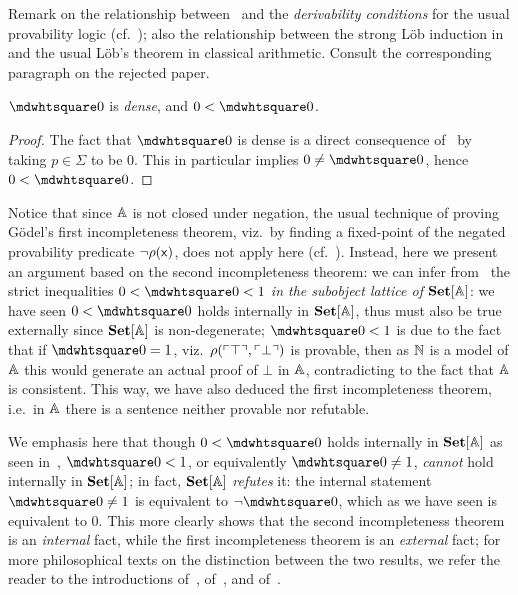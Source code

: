 \begin{remark}\label{rem:derivabilityconditions}
  Remark on the relationship between~ and the \emph{derivability conditions} for the usual provability logic (cf.~\citet[Def.~III.2.16]{Hájek_Pudlák_2017}); also the relationship between the strong L\"ob induction in~ and the usual L\"ob's theorem in classical arithmetic. Consult the corresponding paragraph on the rejected paper.
\end{remark}

\begin{corollary}\label{cor:secondincomp}
  $\bx 0$ is \emph{dense}, and $0 < \bx 0$. 
\end{corollary}
\begin{proof}
  The fact that $\bx 0$ is dense is a direct consequence of~ by taking $p\in\Sigma$ to be $0$. This in particular implies $0 \neq \bx 0$, hence $0 < \bx 0$. 
\end{proof}

\begin{remark}\label{rem:firstfromsecond}
  Notice that since $\mathbb{A}$ is not closed under negation, the usual technique of proving G\"odel's first incompleteness theorem, viz.\ by finding a fixed-point of the negated provability predicate $\neg\rho(\mathsf{x})$, does not apply here (cf.~). Instead, here we present an argument based on the second incompleteness theorem: we can infer from~ the strict inequalities $0 < \bx 0 < 1$ \emph{in the subobject lattice of $\mathbf{Set}[\mathbb{A}]$}: we have seen $0 < \bx 0$ holds internally in $\mathbf{Set}[\mathbb{A}]$, thus must also be true externally since $\mathbf{Set}[\mathbb{A}]$ is non-degenerate; $\bx 0 < 1$ is due to the fact that if $\bx 0 = 1$, viz.\ $\rho(\ulcorner \top \urcorner,\ulcorner \bot \urcorner)$ is provable, then as $\mathbb{N}$ is a model of $\mathbb{A}$ this would generate an actual proof of $\bot$ in $\mathbb{A}$, contradicting to the fact that $\mathbb{A}$ is consistent. This way, we have also deduced the first incompleteness theorem, i.e.\ in $\mathbb{A}$ there is a sentence neither provable nor refutable.

  We emphasis here that though $0 < \bx 0$ holds internally in $\mathbf{Set}[\mathbb{A}]$ as seen in~, $\bx 0 < 1$, or equivalently $\bx 0 \neq 1$, \emph{cannot} hold internally in $\mathbf{Set}[\mathbb{A}]$; in fact, $\mathbf{Set}[\mathbb{A}]$ \emph{refutes} it: the internal statement $\bx 0 \neq 1$ is equivalent to $\neg\bx 0$, which as we have seen is equivalent to $0$. This more clearly shows that the second incompleteness theorem is an \emph{internal} fact, while the first incompleteness theorem is an \emph{external} fact; for more philosophical texts on the distinction between the two results, we refer the reader to the introductions of~\citet{feferman_arithmetization_1960}, of~\citet{halbach2014self}, and of~\citet{grabmayr_varieties_2023}. 
\end{remark}


